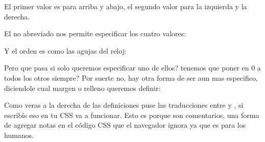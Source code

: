 \documentclass[letterpaper,10pt,spanish]{sphinxmanual}
\begin{document}
El primer valor es para arriba y abajo, el segundo valor para la izquierda y la
derecha.

El no abreviado nos permite especificar los cuatro valores:

%
\begin{sphinxVerbatim}[commandchars=\\\{\}]
    
    
\end{sphinxVerbatim}

Y el orden es como las agujas del reloj:

%
\begin{sphinxVerbatim}[commandchars=\\\{\}]
    
    
\end{sphinxVerbatim}

Pero que pasa si solo queremos especificar uno de ellos? tenemos que poner en 0
a todos los otros siempre? Por suerte no, hay otra forma de ser aun mas
especifico, diciendole cual margen o relleno queremos definir:

%
\begin{sphinxVerbatim}[commandchars=\\\{\}]
     
   
  
    
\end{sphinxVerbatim}

Como veras a la derecha de las definiciones puse las traducciones entre \sphinxtitleref{/*} y
\sphinxtitleref{*/}, si escribís eso en tu CSS va a funcionar. Esto es porque son comentarios,
una forma de agregar notas en el código CSS que el navegador ignora ya que es
para los humanos.
\end{document}
